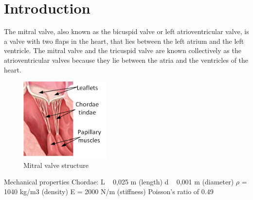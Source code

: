 \chapter*{Introduction}
The mitral valve, also known as the bicuspid valve or left atrioventricular
valve, is a valve with two flaps in the heart, that lies between the left atrium
and the left ventricle. The mitral valve and the tricuspid valve are known
collectively as the atrioventricular valves because they lie between the atria
and the ventricles of the heart.
\begin{figure}[H]
  \centering
  \includegraphics[width=0.4\textwidth]{./fig/mt.png}
    \caption{Mitral valve structure}
    \label{fig:MT}
\end{figure}
Mechanical properties
Chordae:
L ~ 0,025 m (length)
d ~ 0,001 m (diameter)
$\rho$ = 1040 kg/m3 (density)
E = 2000 N/m (stiffness)
Poisson's ratio of 0.49

